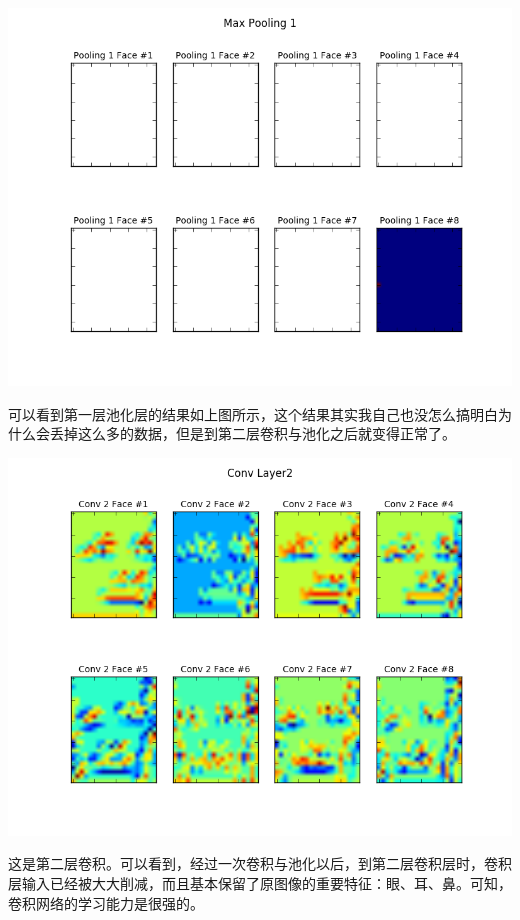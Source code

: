 \documentclass{article}
\begin{document}
\begin{center}
\includegraphics[width=0.8\linewidth]{../image/pool1.png}\\
\end{center}

可以看到第一层池化层的结果如上图所示，这个结果其实我自己也没怎么搞明白为什么会丢掉这么多的数据，但是到第二层卷积与池化之后就变得正常了。\\

\begin{center}
\includegraphics[width=0.8\linewidth]{../image/conv2.png}
\end{center}

这是第二层卷积。可以看到，经过一次卷积与池化以后，到第二层卷积层时，卷积层输入已经被大大削减，而且基本保留了原图像的重要特征：眼、耳、鼻。可知，卷积网络的学习能力是很强的。\\
\end{document}
